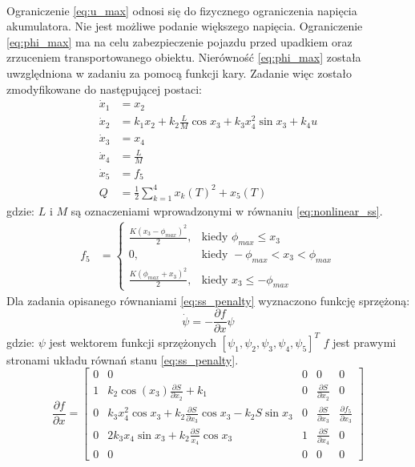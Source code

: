 \paragraph*{}
Ograniczenie \eqref{eq:u_max} odnosi się do fizycznego ograniczenia napięcia akumulatora. Nie jest możliwe podanie większego napięcia. Ograniczenie \eqref{eq:phi_max} ma na celu zabezpieczenie pojazdu przed upadkiem oraz zrzuceniem transportowanego obiektu. Nierówność \eqref{eq:phi_max} została uwzględniona w zadaniu za pomocą funkcji kary. Zadanie więc zostało zmodyfikowane do następującej postaci:
\begin{equation}
\begin{aligned}
\dot x_1 &=x_2\\
\dot x_2 &=k_1x_2+k_2\frac{L}{M}\cos x_3+k_3x_4^2\sin x_3+k_4u\\
\dot x_3 &=x_4\\
\dot x_4 &=\frac{L}{M}\\
\dot x_5 &=f_5\\
Q &=\frac{1}{2}\sum\limits_{k=1}^4 x_k(T)^2+x_5(T)
\end{aligned}
\label{eq:ss_penalty}
\end{equation}
\noindent gdzie:\newline
\(L\) i \(M\) są oznaczeniami wprowadzonymi w równaniu \eqref{eq:nonlinear_ss}.
\begin{equation}
\begin{aligned}
f_5 &=
	\begin{cases}
	\frac{K(x_3-\phi_{max})^2}{2}, & \text{kiedy } \phi_{max}\leqslant x_3\\
	0, & \text{kiedy } -\phi_{max}<x_3<\phi_{max}\\
	\frac{K(\phi_{max}+x_3)^2}{2}, & \text{kiedy } x_3\leqslant -\phi_{max}
	\end{cases}
\end{aligned}
\end{equation}
Dla zadania opisanego równaniami \eqref{eq:ss_penalty} wyznaczono funkcję sprzężoną:
\begin{equation}
\dot \psi=-\frac{\partial f}{\partial x}\psi
\end{equation}
\noindent gdzie:\newline
\(\psi\) jest wektorem funkcji sprzężonych \([\psi_1, \psi_2, \psi_3, \psi_4, \psi_5]^T\)\newline
\(f\) jest prawymi stronami układu równań stanu \eqref{eq:ss_penalty}.
\begin{equation}
\frac{\partial f}{\partial x}=\begin{bmatrix}
0 & 0 & 0 & 0 & 0\\
1 & k_2\cos(x_3)\frac{\partial S}{\partial x_2}+k_1 & 0 & \frac{\partial S}{\partial x_2} & 0\\
0 & k_3x_4^2\cos x_3+k_2\frac{\partial S}{\partial x_3}\cos x_3-k_2S\sin x_3 & 0 & \frac{\partial S}{\partial x_3} & \frac{\partial f_5}{\partial x_3}\\
0 & 2k_3x_4\sin x_3+k_2\frac{\partial S}{x_4}\cos x_3 & 1 & \frac{\partial S}{\partial x_4} & 0\\
0 & 0 & 0 & 0 & 0
\end{bmatrix}
\end{equation}

